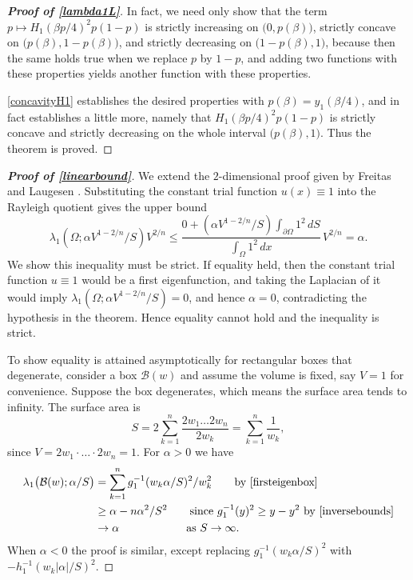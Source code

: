 \documentclass[12pt,reqno]{amsart}
\theoremstyle{definition}
\newcommand{\ho}{H_1}
\begin{document}
\begin{proof}[\bf Proof of \autoref{lambda1L}]
In fact, we need only show that the term $p \mapsto \ho(\beta p/4)^2 p(1-p)$ is strictly increasing on $\big( 0, p(\beta) )$, strictly concave on $\big( p(\beta),1-p(\beta) \big)$, and strictly decreasing on $\big( 1-p(\beta),1 \big)$, because then the same holds true when we replace $p$ by $1-p$, and adding two functions with these properties yields another function with these properties. 

\autoref{concavityH1} establishes the desired properties with $p(\beta)=y_1(\beta/4)$, and in fact establishes a little more, namely that $\ho(\beta p/4)^2 p(1-p)$ is strictly concave and strictly decreasing on the whole interval $\big( p(\beta),1 \big)$. Thus the theorem is proved. 
\end{proof}
%
%
\begin{proof}[\bf Proof of \autoref{linearbound}]
We extend the $2$-dimensional proof given by Freitas and Laugesen \cite[Theorem A]{FL18b}. Substituting the constant trial function $u(x) \equiv 1$ into the Rayleigh quotient gives the upper bound
\[
   \lambda_1(\Omega;\alpha V^{1-2/n}/S) V^{2/n} \leq \frac{0 + (\alpha V^{1-2/n}/S)\int_{\partial \Omega} 1^2 \, dS}{\int_\Omega 1^2 \, dx} \, V^{2/n} = \alpha.
\]
We show this inequality must be strict. If equality held, then the constant trial function $u \equiv 1$ would be a first eigenfunction, and taking the Laplacian of it would imply $\lambda_1(\Omega;\alpha V^{1-2/n}/S) = 0$, and hence $\alpha=0$, contradicting the hypothesis in the theorem. Hence equality cannot hold and the inequality is strict. 

To show equality is attained asymptotically for rectangular boxes that degenerate, consider a box $\mathcal{B}(w)$ and assume the volume is fixed, say $V=1$ for convenience. Suppose the box degenerates, which means the surface area tends to infinity. The surface area is 
\[
S = 2 \sum_{k=1}^n \frac{2w_1 \dots 2w_n}{2w_k} = \sum_{k=1}^n \frac{1}{w_k} ,
\]
since $V=2w_1 \cdot \dots \cdot 2w_n=1$. 
For $\alpha>0$ we have
%
\begin{align*}
\lambda_1\big(\mathcal{B}(w);\alpha/S\big) 
& = \sum_{k=1}^n g_1^{-1}(w_k \alpha/S)^2/w_k^2 \qquad \text{by \autoref{firsteigenbox}} \\
& \geq \alpha - n\alpha^2/S^2 \qquad \text{since $g_1^{-1}(y)^2 \geq y-y^2$ by \autoref{inversebounds}} \\
& \to \alpha \qquad \qquad \qquad \text{as $S \to \infty$.}
\end{align*}
%
When $\alpha<0$ the proof is similar, except replacing $g_1^{-1}(w_k \alpha/S)^2$ with $-h_1^{-1}(w_k |\alpha|/S)^2$. 
\end{proof}
\end{document}
